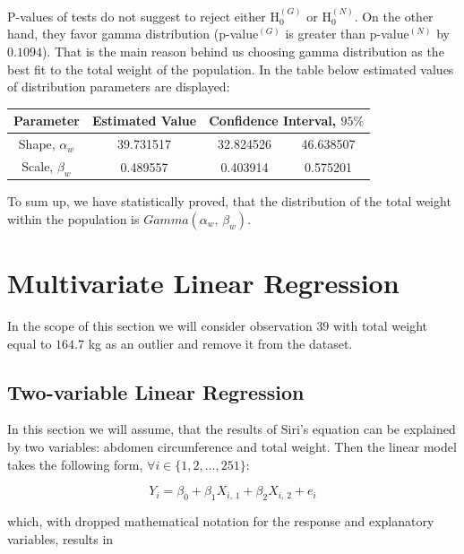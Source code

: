 \documentclass[11pt,american,american]{article}
\begin{document}
P-values of tests do not suggest to reject either $\text{H}_{0}^{(G)}$ or $\text{H}_{0}^{(N)}$. On the other hand, they favor gamma distribution (p-value$^{(G)}$ is greater than p-value$^{(N)}$ by $0.1094$). That is the main reason behind us choosing gamma distribution as the best fit to the total weight of the population. In the table below estimated values of distribution parameters are displayed:

\begin{table}[ht!]
	\centering
	\begin{tabular}{|c||c||c|c|}
		\hline 
		Parameter &  Estimated Value & \multicolumn{2}{c|}{Confidence Interval, $95\%$}  \\ 
		\hline \hline 
		Shape, $\alpha_{w}$ & 39.731517 & 32.824526 &  46.638507 \\ 
		\cline{1-4}
		Scale, $\beta_{w}$ & 0.489557 & 0.403914 &  0.575201 \\ 
		\hline
	\end{tabular} 
\end{table}

To sum up, we have statistically proved, that the distribution of the total weight within the population is $Gamma(\alpha_{w}, \, \beta_{w})$.


\section{Multivariate Linear Regression}\label{sec:regression}

In the scope of this section we will consider observation $39$ with total weight equal to $164.7$ kg as an outlier and remove it from the dataset.

\subsection{Two-variable Linear Regression}

In this section we will assume, that the results of Siri's equation can be explained by two variables: abdomen circumference and total weight. Then the linear model takes the following form, $\forall i \in \{1,2, \dots, 251\}$:

\begin{equation}
		Y_{i} = \beta_{0} + \beta_{1} X_{i,\,1} + \beta_{2} X_{i,\,2} + e_{i}
\end{equation}

\medskip
\noindent
which, with dropped mathematical notation for the response and explanatory variables, results in
\end{document}
